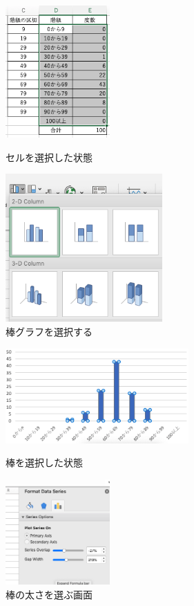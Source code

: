 \begin{figure}[htbp]
    \begin{minipage}{0.5\hsize}
        \centering
  \includegraphics[width=4cm]{chap1/select_cells_hist.png}
  \caption{セルを選択した状態}
  \label{fig:select_cells_hist}
 \end{minipage}
 \begin{minipage}{0.5\hsize}
        \centering
  \includegraphics[width=6cm]{chap1/select_barchart_hist.png}
  \caption{棒グラフを選択する}
  \label{fig:select_barchart_hist}
 \end{minipage}
\end{figure}

\begin{figure}[htbp]
    \begin{minipage}{0.5\hsize}
        \centering
        \includegraphics[width=7cm]{chap1/select_bar_hist.png}
        \caption{棒を選択した状態}
        \label{fig:select_bar_hist}
    \end{minipage}
    \begin{minipage}{0.5\hsize}
        \centering
        \includegraphics[width=4cm]{chap1/select_width_hist.png}
        \caption{棒の太さを選ぶ画面}
        \label{fig:select_width_hist}
    \end{minipage}
\end{figure}

